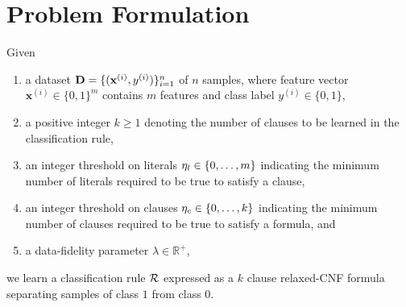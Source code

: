 \section{Problem Formulation}
\label{interpretability_crr_sec:problem}

Given 
\begin{enumerate}
	\item a dataset $ \mathbf{D} = \{(\mathbf{x}^{(i)}, y^{(i)})\}_{i=1}^n$ of $ n $ samples, where feature vector $ \mathbf{x}^{(i)} \in \{0, 1\}^m $ contains $ m $ features and class label $ y^{(i)} \in \{0,1\} $,
	\item a positive integer $ k \ge 1 $ denoting the number of clauses to be learned in the classification rule, 
	\item an integer threshold on literals $ \eta_{l} \in  \{0,\dots,m\} $ indicating  the  minimum number of literals required to be true  to satisfy a clause,
	\item an  integer threshold on clauses $ \eta_{c} \in  \{0,\dots,k\} $ indicating the minimum number of clauses required to be  true  to satisfy a formula, and
	\item a data-fidelity  parameter $ \lambda \in \mathbb{R}^+ $,
\end{enumerate}
we  learn  a classification rule $ {\mathcal{R}} $ expressed as a $ k $ clause relaxed-CNF formula separating samples of class $ 1 $ from class $ 0 $. 





